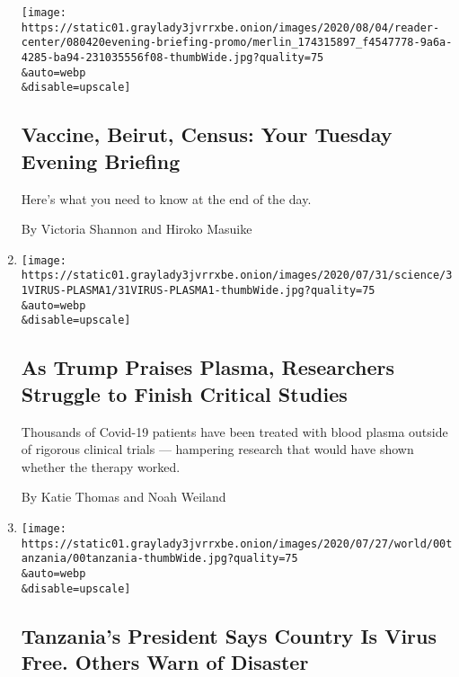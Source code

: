 \begin{enumerate}
  \texttt{[image: https://static01.graylady3jvrrxbe.onion/images/2020/08/04/reader-center/080420evening-briefing-promo/merlin\_174315897\_f4547778-9a6a-4285-ba94-231035556f08-thumbWide.jpg?quality=75\\\&auto=webp\\\&disable=upscale]}

  \hypertarget{vaccine-beirut-census-your-tuesday-evening-briefing}{%
  \subsection{Vaccine, Beirut, Census: Your Tuesday Evening
  Briefing}\label{vaccine-beirut-census-your-tuesday-evening-briefing}}

  Here's what you need to know at the end of the day.

  By Victoria Shannon and Hiroko Masuike
\item
  \href{/2020/08/04/health/trump-plasma.html}{}

  \texttt{[image: https://static01.graylady3jvrrxbe.onion/images/2020/07/31/science/31VIRUS-PLASMA1/31VIRUS-PLASMA1-thumbWide.jpg?quality=75\\\&auto=webp\\\&disable=upscale]}

  \hypertarget{as-trump-praises-plasma-researchers-struggle-to-finish-critical-studies}{%
  \subsection{As Trump Praises Plasma, Researchers Struggle to Finish
  Critical
  Studies}\label{as-trump-praises-plasma-researchers-struggle-to-finish-critical-studies}}

  Thousands of Covid-19 patients have been treated with blood plasma
  outside of rigorous clinical trials --- hampering research that would
  have shown whether the therapy worked.

  By Katie Thomas and Noah Weiland
\item
  \href{/2020/08/04/world/africa/tanzanias-coronavirus-president.html}{}

  \texttt{[image: https://static01.graylady3jvrrxbe.onion/images/2020/07/27/world/00tanzania/00tanzania-thumbWide.jpg?quality=75\\\&auto=webp\\\&disable=upscale]}

  \hypertarget{tanzanias-president-says-country-is-virus-free-others-warn-of-disaster}{%
  \subsection{Tanzania's President Says Country Is Virus Free. Others
  Warn of
  Disaster}\label{tanzanias-president-says-country-is-virus-free-others-warn-of-disaster}}


\end{enumerate}
